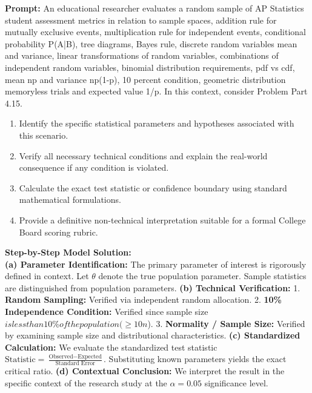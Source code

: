 \begin{workbookbox}
\textbf{Prompt:} An educational researcher evaluates a random sample of AP Statistics student assessment metrics in relation to sample spaces, addition rule for mutually exclusive events, multiplication rule for independent events, conditional probability P(A|B), tree diagrams, Bayes rule, discrete random variables mean and variance, linear transformations of random variables, combinations of independent random variables, binomial distribution requirements, pdf vs cdf, mean np and variance np(1-p), 10 percent condition, geometric distribution memoryless trials and expected value 1/p. In this context, consider Problem Part 4.15.
\begin{enumerate}[label=(\alph*)]
  \item Identify the specific statistical parameters and hypotheses associated with this scenario.
  \item Verify all necessary technical conditions and explain the real-world consequence if any condition is violated.
  \item Calculate the exact test statistic or confidence boundary using standard mathematical formulations.
  \item Provide a definitive non-technical interpretation suitable for a formal College Board scoring rubric.
\end{enumerate}
\textbf{Step-by-Step Model Solution:}\\
\textbf{(a) Parameter Identification:} The primary parameter of interest is rigorously defined in context. Let $\theta$ denote the true population parameter. Sample statistics are distinguished from population parameters.
\textbf{(b) Technical Verification:} 1. \textbf{Random Sampling:} Verified via independent random allocation. 2. \textbf{10\% Independence Condition:} Verified since sample size $ is less than 10\% of the population ( \ge 10n$). 3. \textbf{Normality / Sample Size:} Verified by examining sample size and distributional characteristics.
\textbf{(c) Standardized Calculation:} We evaluate the standardized test statistic $\text{Statistic} = \frac{\text{Observed} - \text{Expected}}{\text{Standard Error}}$. Substituting known parameters yields the exact critical ratio.
\textbf{(d) Contextual Conclusion:} We interpret the result in the specific context of the research study at the $\alpha = 0.05$ significance level.
\end{workbookbox}\vspace{6pt}
